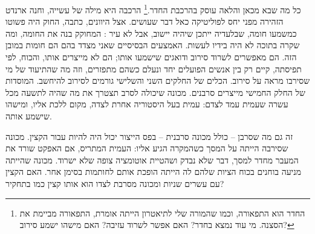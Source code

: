 כל מה שבא מכאן והלאה עוסק בהרכבת החדר.\footnote{החדר הוא התפאורה, וכמו שהמורה שלי לתיאטרון הייתה אומרת, התפאורה מביימת את הסצנה. מי עוד נמצא בחדר? האם אפשר לשרוד עזיבה? האם מישהו ישמע סירוב?} הרכבה היא מילה של עשייה, וחנה ארנדט הזהירה מפני יחס לפוליטיקה כאל דבר שעושים. אצל היוונים, כתבה, החוק היה פשוטו כמשמעו חומה, שבלעדיה ייתכן שיהיה יישוב, אבל לא עיר \autocite{arendt1958human}: המחוקק בנה את החומה, ומה שקרה בתוכה לא היה בידיו לעשות. האמצעים הבסיסיים שאני מצדד בהם הם חומות במובן הזה. הם מאפשרים לשרוד סירוב ודואגים שישמעו אותו; הם לא מייצרים אותו, והכוח, לפי תפיסתה, קיים רק בין אנשים הפועלים יחד ונעלם כשהם מתפזרים, וזה מה שהתיעוד של מי שסירבו מראה על סירוב. הכלים של החלקים השני והשלישי גורמים לסירוב להיחשב. המוסדות של החלק החמישי מייצרים סרבנים. מכונה שיכולה לסרב תצטרך את מה שהיה לתשעה מכל עשרה שעמית עמד לצדם: עמית בעל היסטוריה אחרת לצדה, מקום ללכת אליו, ומישהו שישמע אותה.

זה גם מה שסרבן – כולל מכונה סרבנית – בפס הייצור יכול היה להיות עבור הקצין. מכונה שסירבה הייתה על המסך כשהמקרה הגיע אליו: העמית המתריס, אם האפקט שורד את המעבר מחדר למסך, דבר שלא נבדק ושהטיית אוטומציה צופה שלא ישרוד. מכונה שהייתה מניעה בוחנים בכוח הציות שלהם לה הייתה הופכת אותם לחותמות בסימן אחר. האם הקצין עם עשרים שניות ומכונה מסרבת לצדו הוא אותו קצין כמו בתחקיר?
